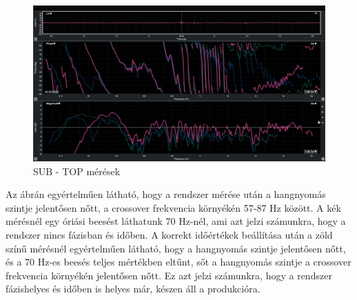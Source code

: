 \begin{figure}[H]
	\centering
	\includegraphics[width=\textwidth, keepaspectratio]{figures/smaart_sub_top.jpg}
	\caption{SUB - TOP mérések}\label{fig:smaart_sub_top}
\end{figure}
Az ábrán egyértelműen látható, hogy a rendszer mérése után a hangnyomás szintje jelentősen nőtt, a crossover frekvencia környékén
57-87 Hz között. A kék mérésnél egy óriási beesést láthatunk 70 Hz-nél, ami azt jelzi számunkra, hogy a rendszer nincs fázisban és időben.
A korrekt időértékek beállítása után a zöld színű mérésnél egyértelműen látható, hogy a hangnyomás szintje jelentősen nőtt, és a 70 Hz-es
beesés teljes mértékben eltűnt, sőt a hangnyomás szintje a crossover frekvencia környékén jelentősen nőtt. Ez azt jelzi számunkra, hogy a rendszer
fázishelyes és időben is helyes már, készen áll a produkcióra.










